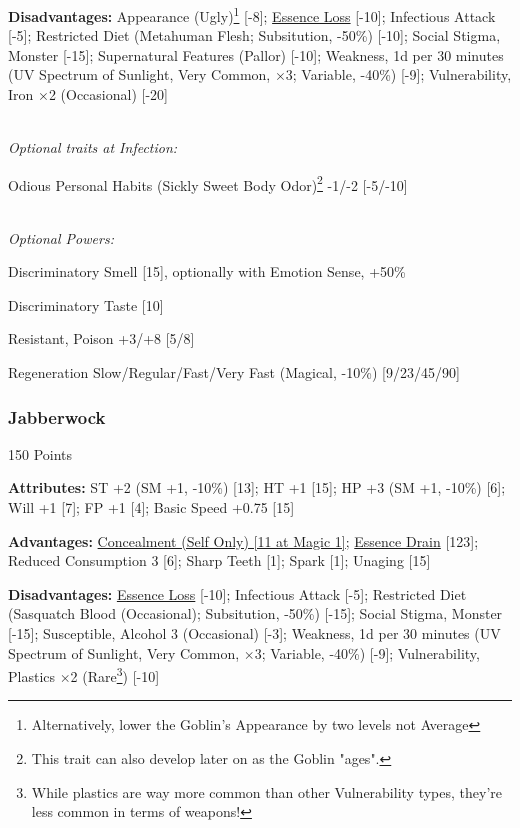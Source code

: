 \begin{multicols*}{3}
	\textbf{Disadvantages:}	
	Appearance (Ugly)\footnote{Alternatively, lower the Goblin's Appearance by two levels not Average} [-8]; \hyperref[essence_loss]{Essence Loss} [-10]; Infectious Attack [-5]; Restricted Diet (Metahuman Flesh; Subsitution, -50\%) [-10]; Social Stigma, Monster [-15]; Supernatural Features (Pallor) [-10]; Weakness, 1d per 30 minutes (UV Spectrum of Sunlight, Very Common, $\times$3; Variable, -40\%) [-9]; Vulnerability, Iron  $\times$2 (Occasional) [-20]
		
		
	\textit{\\Optional traits at Infection:}
	
	Odious Personal Habits (Sickly Sweet Body Odor)\footnote{This trait can also develop later on as the Goblin "ages".} -1/-2 [-5/-10]
		
	\textit{\\Optional Powers:}
		
	Discriminatory Smell [15], optionally with Emotion Sense, +50\%
	
	Discriminatory Taste [10]
		
	Resistant, Poison +3/+8 [5/8]
	
	Regeneration Slow/Regular/Fast/Very Fast (Magical, -10\%) [9/23/45/90]
		
	\subsubsection{Jabberwock}\label{jabberwock}
	\begin{flushright}
		150 Points
	\end{flushright}
	
	\textbf{Attributes:}
	ST +2 (SM +1, -10\%) [13]; HT +1 [15]; HP +3 (SM +1, -10\%) [6]; Will +1 [7]; FP +1 [4]; Basic Speed +0.75 [15]
	
	\textbf{Advantages:}
	\hyperref[concealment_self_only]{Concealment (Self Only) [11 at Magic 1]}; \hyperref[essence_drain]{Essence Drain} [123]; Reduced Consumption 3 [6]; Sharp Teeth [1]; Spark [1]; Unaging [15]
	
	\textbf{Disadvantages:}	
	\hyperref[essence_loss]{Essence Loss} [-10]; Infectious Attack [-5]; Restricted Diet (Sasquatch Blood (Occasional); Subsitution, -50\%) [-15]; Social Stigma, Monster [-15]; Susceptible, Alcohol 3 (Occasional) [-3]; Weakness, 1d per 30 minutes (UV Spectrum of Sunlight, Very Common, $\times$3; Variable, -40\%) [-9]; Vulnerability, Plastics $\times$2 (Rare\footnote{While plastics are way more common than other Vulnerability types, they're less common in terms of weapons!}) [-10]
	

\end{multicols*}
